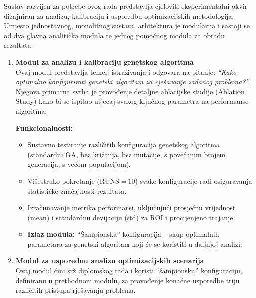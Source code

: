 Sustav razvijen za potrebe ovog rada predstavlja cjeloviti eksperimentalni okvir dizajniran za analizu, kalibraciju i usporedbu optimizacijskih metodologija. Umjesto jednostavnog, monolitnog sustava, arhitektura je modularna i sastoji se od dva glavna analitička modula te jednog pomoćnog modula za obradu rezultata:

\begin{enumerate}
    \item \textbf{Modul za analizu i kalibraciju genetskog algoritma} \\
    Ovaj modul predstavlja temelj istraživanja i odgovara na pitanje: \emph{``Kako optimalno konfigurirati genetski algoritam za rješavanje zadanog problema?''}. Njegova primarna svrha je provođenje detaljne ablacijske studije (Ablation Study) kako bi se ispitao utjecaj svakog ključnog parametra na performanse algoritma.
    
    \textbf{Funkcionalnosti:}
    \begin{itemize}
        \item Sustavno testiranje različitih konfiguracija genetskog algoritma (standardni GA, bez križanja, bez mutacije, s povećanim brojem generacija, s većom populacijom).
        \item Višestruko pokretanje (\( \text{RUNS} = 10 \)) svake konfiguracije radi osiguravanja statističke značajnosti rezultata.
        \item Izračunavanje metrika performansi, uključujući prosječnu vrijednost (mean) i standardnu devijaciju (std) za ROI i procijenjeno trajanje.
        \item \textbf{Izlaz modula:} ``Šampionska'' konfiguracija – skup optimalnih parametara za genetski algoritam koji će se koristiti u daljnjoj analizi.
    \end{itemize}

    \item \textbf{Modul za usporednu analizu optimizacijskih scenarija} \\
    Ovaj modul čini srž diplomskog rada i koristi ``šampionsku'' konfiguraciju, definiranu u prethodnom modulu, za provođenje konačne usporedbe triju različitih pristupa rješavanju problema.
    

\end{enumerate}
